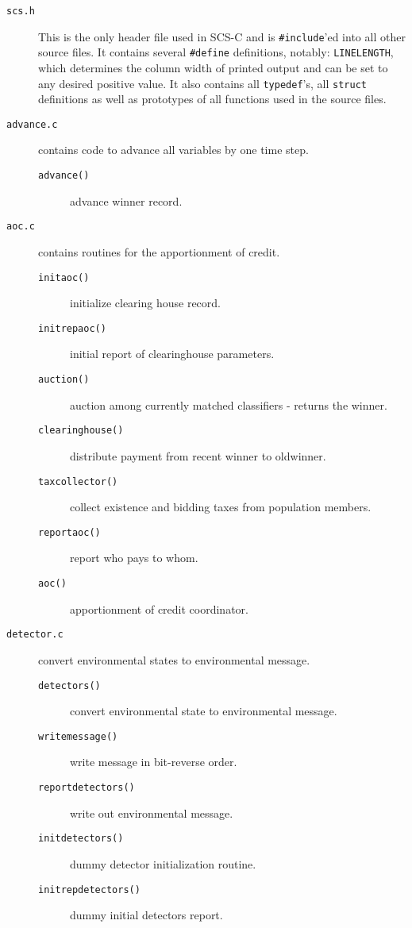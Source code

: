 \begin{description}

\item[\verb!scs.h!] This is the only header file used in SCS-C
and is \verb!#include!'ed into all other source files. It
contains several \verb!#define! definitions, notably:
\verb!LINELENGTH!, which determines the
column width of printed output and can be set to any desired 
positive value. It also contains all \verb!typedef!'s, all
\verb!struct! definitions as well as prototypes of all
functions used in the source files.
 

\item[\verb!advance.c!] contains code to advance all variables
by one time step.
  \begin{description}
    \item[\verb!advance()!] advance winner record. 
  \end{description}

\item[\verb!aoc.c!] contains routines for the apportionment of
credit.
  \begin{description}
    \item[\verb!initaoc()!] initialize clearing house record.
    \item[\verb!initrepaoc()!] initial report of clearinghouse
parameters.
    \item[\verb!auction()!] auction among currently matched
classifiers - returns the winner.
    \item[\verb!clearinghouse()!] distribute payment from
recent winner to oldwinner. 
    \item[\verb!taxcollector()!] collect existence and bidding
taxes from population members. 
    \item[\verb!reportaoc()!] report who pays to whom. 
    \item[\verb!aoc()!] apportionment of credit coordinator.
  \end{description}



\item[\verb!detector.c!] convert environmental states to
environmental message.
  \begin{description}
    \item[\verb!detectors()!] convert environmental state to
environmental message.
    \item[\verb!writemessage()!] write message in bit-reverse
order.
    \item[\verb!reportdetectors()!] write out environmental
message.
    \item[\verb!initdetectors()!] dummy detector
initialization routine.
    \item[\verb!initrepdetectors()!] dummy initial detectors
report.
  \end{description}



\end{description}
